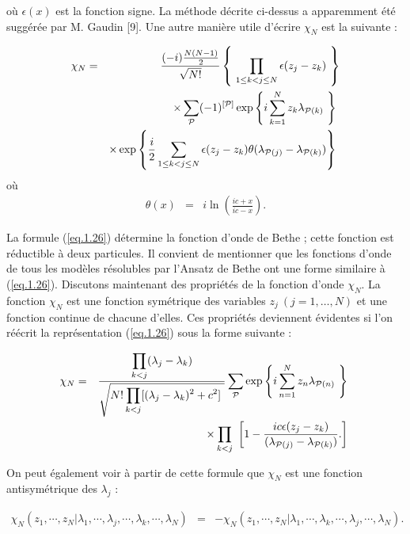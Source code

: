 où $\epsilon(x)$ est la fonction signe. La méthode décrite ci-dessus a apparemment été suggérée par M. Gaudin [9].
Une autre manière utile d'écrire $\chi_N$ est la suivante :

\begin{eqnarray}
	\chi_N & = &	\frac{(-i){\frac{N(N-1)}2}}{ \sqrt{N!}}\left \{  \prod_{1\leq k<j\leq N} \epsilon (z_j -z_k ) \right \}\notag \\
	&&  \times \sum_{\mathcal{P}} (-1)^{[\mathcal{P}]} \exp \left \{ i \sum_{k = 1}^N  z_k \lambda_{ \mathcal{P}(k) } \right \} \notag \\
	&& \times \exp \left \{  \frac{i}{2} \sum_{1\leq k<j\leq N} \epsilon (z_j -z_k ) \theta(\lambda_{\mathcal{P}(j)}- \lambda_{\mathcal{P}(k)}  )  \right \} \label{eq.1.26} 
\end{eqnarray}
où
\begin{eqnarray*}
	\theta ( x ) & = & i \ln \left ( \frac{ic + x }{ic - x } \right ) .
\end{eqnarray*}

La formule (\ref{eq.1.26}) détermine la fonction d'onde de Bethe ; cette fonction est réductible à deux particules. Il convient de mentionner que les fonctions d'onde de tous les modèles résolubles par l'Ansatz de Bethe ont une forme similaire à (\ref{eq.1.26}). Discutons maintenant des propriétés de la fonction d'onde $\chi_N$. La fonction $\chi_N$ est une fonction symétrique des variables $z_j \ (j = 1, \dots, N)$ et une fonction continue de chacune d'elles. Ces propriétés deviennent évidentes si l'on réécrit la représentation (\ref{eq.1.26}) sous la forme suivante :

\begin{eqnarray}
	\chi_N & = &	\frac{  \displaystyle \prod_{k<j} ( \lambda_j - \lambda_k ) }{ \sqrt{N! \displaystyle \prod_{k<j}  [ ( \lambda_j - \lambda_k )^2 +c^2 ] } }  \sum_{\mathcal{P}}\exp \left \{ i \sum_{n = 1}^N  z_n \lambda_{ \mathcal{P}(n) } \right \} \notag \\
	&& \times \prod_{k<j}  	\left [ 1 - \frac{ic \epsilon(z_j - z_k ) }{( \lambda_{ \mathcal{P}(j) }  - \lambda_{ \mathcal{P}(k) }  ) }.  \right ] 
\end{eqnarray}

On peut également voir à partir de cette formule que $\chi_N$ est une fonction antisymétrique des $\lambda_j$ :

\begin{eqnarray}
	\chi_N ( z_1 , \cdots , z_N \vert \lambda_1 , \cdots , \lambda_j , \cdots , \lambda_k , \cdots , \lambda_N ) & =& - 	\chi_N ( z_1 , \cdots , z_N \vert \lambda_1 , \cdots , \lambda_k , \cdots , \lambda_j , \cdots , \lambda_N ).
\end{eqnarray}

